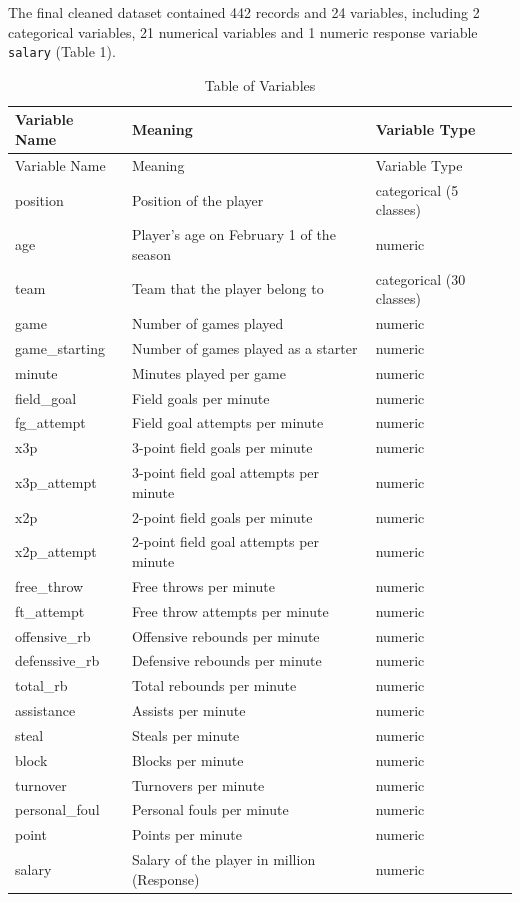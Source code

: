 \documentclass[
]{article}
\begin{document}
The final cleaned dataset contained 442 records and 24 variables,
including 2 categorical variables, 21 numerical variables and 1 numeric
response variable \texttt{salary} (Table 1).

\begin{longtable}[]{@{}lll@{}}
\caption{Table of Variables}\tabularnewline
\toprule
Variable Name & Meaning & Variable Type \\
\midrule
\endfirsthead
\toprule
Variable Name & Meaning & Variable Type \\
\midrule
\endhead
position & Position of the player & categorical (5 classes) \\
age & Player's age on February 1 of the season & numeric \\
team & Team that the player belong to & categorical (30 classes) \\
game & Number of games played & numeric \\
game\_starting & Number of games played as a starter & numeric \\
minute & Minutes played per game & numeric \\
field\_goal & Field goals per minute & numeric \\
fg\_attempt & Field goal attempts per minute & numeric \\
x3p & 3-point field goals per minute & numeric \\
x3p\_attempt & 3-point field goal attempts per minute & numeric \\
x2p & 2-point field goals per minute & numeric \\
x2p\_attempt & 2-point field goal attempts per minute & numeric \\
free\_throw & Free throws per minute & numeric \\
ft\_attempt & Free throw attempts per minute & numeric \\
offensive\_rb & Offensive rebounds per minute & numeric \\
defenssive\_rb & Defensive rebounds per minute & numeric \\
total\_rb & Total rebounds per minute & numeric \\
assistance & Assists per minute & numeric \\
steal & Steals per minute & numeric \\
block & Blocks per minute & numeric \\
turnover & Turnovers per minute & numeric \\
personal\_foul & Personal fouls per minute & numeric \\
point & Points per minute & numeric \\
salary & Salary of the player in million (Response) & numeric \\
\bottomrule
\end{longtable}
\end{document}
